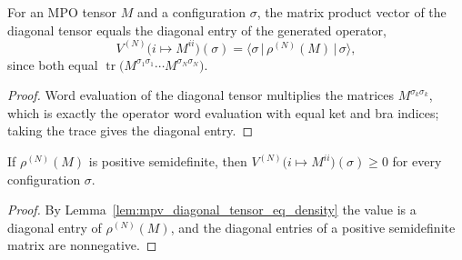 \begin{lemma}
    \label{lem:mpv_diagonal_tensor_eq_density}
    \leanok
    For an MPO tensor $M$ and a configuration $\sigma$, the matrix product vector of
    the diagonal tensor equals the diagonal entry of the generated operator,
    \[
        V^{(N)}\bigl(i\mapsto M^{ii}\bigr)(\sigma)
        = \bigl\langle\sigma\,\big|\,\rho^{(N)}(M)\,\big|\,\sigma\bigr\rangle,
    \]
    since both equal $\operatorname{tr}\bigl(M^{\sigma_1\sigma_1}\cdots
        M^{\sigma_N\sigma_N}\bigr)$.
\end{lemma}
\begin{proof}\leanok
    Word evaluation of the diagonal tensor multiplies the matrices
    $M^{\sigma_k\sigma_k}$, which is exactly the operator word evaluation with equal
    ket and bra indices; taking the trace gives the diagonal entry.
\end{proof}

\begin{lemma}
    \label{lem:mpv_diagonal_tensor_nonneg}
    \leanok
    If $\rho^{(N)}(M)$ is positive semidefinite, then
    $V^{(N)}\bigl(i\mapsto M^{ii}\bigr)(\sigma)\ge 0$ for every configuration
    $\sigma$.
\end{lemma}
\begin{proof}\leanok
    By Lemma~\ref{lem:mpv_diagonal_tensor_eq_density} the value is a diagonal entry of $\rho^{(N)}(M)$, and the
    diagonal entries of a positive semidefinite matrix are nonnegative.
\end{proof}

